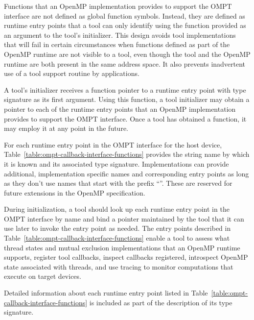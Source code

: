 \label{sec:ompt-bind}

Functions that an OpenMP implementation provides to support the OMPT interface
are not defined as global function symbols. Instead, they are defined as runtime entry points 
that a tool can only identify using the  function provided as an
argument to the tool's initializer. This design avoids tool
implementations that
will fail in certain circumstances when functions defined as part of
the OpenMP runtime are not visible to a tool, even though the tool and
the OpenMP runtime are both present in the same address space.
It also prevents inadvertent use of a tool support routine by
applications.
 
A tool's initializer receives a function pointer to a 
runtime entry point with type signature
 as its first argument. Using this
function, a tool initializer may obtain a pointer to each of the
runtime entry points that an OpenMP implementation provides to support
the OMPT interface. Once a tool has obtained a 
 function, it may employ it at any point in the future.

For each runtime entry point in the OMPT interface for the host device, 
Table~\ref{table:ompt-callback-interface-functions} provides the string
name by which it is known and its associated type signature. Implementations
can provide additional, implementation specific names and corresponding
entry points as long as they don't use names that start with the prefix
``''. These are reserved for future extensions in the 
OpenMP specification.

During initialization, a tool should look up each runtime entry point in the
OMPT interface by name and bind a pointer maintained by the tool
that it can use later to invoke the entry point as needed. The entry points
described in Table~\ref{table:ompt-callback-interface-functions}
enable a tool to assess 
what thread states and mutual exclusion implementations that an OpenMP runtime supports,
register tool callbacks, inspect callbacks registered,
introspect OpenMP state associated with threads, and use tracing to monitor
computations that execute on target devices.

Detailed information about each runtime entry point listed in 
Table~\ref{table:ompt-callback-interface-functions} is included as
part of the description of its type signature.

